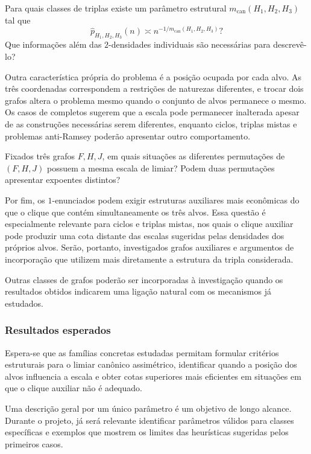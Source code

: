 \documentclass[11pt,a4paper]{article}
\theoremstyle{plain}
\theoremstyle{definition}
\newcounter{question}[section]
\renewcommand{\thequestion}{\thesection.\arabic{question}}
\newenvironment{question}[1][]{%
  \refstepcounter{question}%
  \begin{tcolorbox}[
    enhanced,
    colback=qbluebg,
    colframe=qblue,
    arc=4pt,
    boxrule=1.2pt,
    left=8pt, right=8pt, top=6pt, bottom=6pt,
    fonttitle=\bfseries\sffamily,
    title={\color{white}Pergunta~\thequestion\ifx&#1&\else\ (#1)\fi},
    coltitle=white,
    attach boxed title to top left={yshift=-2mm, xshift=6pt},
    boxed title style={colback=qblue, arc=3pt, boxrule=0pt},
  ]%
  \itshape
}{%
  \end{tcolorbox}%
}
\begin{document}
\begin{question}
  \label{q:param}
  Para quais classes de triplas existe um parâmetro estrutural
  $m_{\mathrm{can}}(H_1,H_2,H_3)$ tal que
  \[
    \widehat p_{H_1,H_2,H_3}(n)
    \asymp
    n^{-1/m_{\mathrm{can}}(H_1,H_2,H_3)}?
  \]
  Que informações além das $2$-densidades individuais são necessárias
  para descrevê-lo?
\end{question}

Outra característica própria do problema é a posição ocupada por cada
alvo. As três coordenadas correspondem a restrições de naturezas
diferentes, e trocar dois grafos altera o problema mesmo quando o
conjunto de alvos permanece o mesmo. Os casos de completos sugerem que
a escala pode permanecer inalterada apesar de as construções necessárias
serem diferentes, enquanto ciclos, triplas mistas e problemas
anti-Ramsey poderão apresentar outro comportamento.

\begin{question}
  \label{q:posicao}
  Fixados três grafos $F,H,J$, em quais situações as diferentes
  permutações de $(F,H,J)$ possuem a mesma escala de limiar?
  Podem duas permutações apresentar expoentes distintos?
\end{question}

Por fim, os $1$-enunciados podem exigir estruturas auxiliares mais
econômicas do que o clique que contém simultaneamente os três alvos.
Essa questão é especialmente relevante para ciclos e triplas mistas,
nos quais o clique auxiliar pode produzir uma cota distante das
escalas sugeridas pelas densidades dos próprios alvos. Serão, portanto,
investigados grafos auxiliares e argumentos de incorporação que utilizem
mais diretamente a estrutura da tripla considerada.

Outras classes de grafos poderão ser incorporadas à investigação
quando os resultados obtidos indicarem uma ligação natural com os
mecanismos já estudados.

\subsubsection{Resultados esperados}

Espera-se que as famílias concretas estudadas permitam formular
critérios estruturais para o limiar canônico assimétrico, identificar
quando a posição dos alvos influencia a escala e obter cotas superiores
mais eficientes em situações em que o clique auxiliar não é adequado.

Uma descrição geral por um único parâmetro é um objetivo de longo
alcance. Durante o projeto, já será relevante identificar parâmetros
válidos para classes específicas e exemplos que mostrem os limites
das heurísticas sugeridas pelos primeiros casos.
\end{document}
